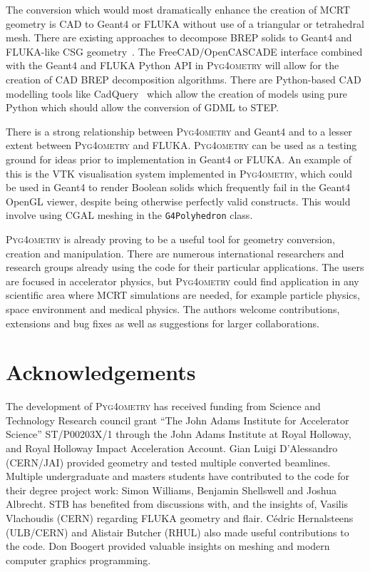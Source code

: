 \documentclass[final,5p,times,twocolumn]{elsarticle}
\newcommand{\pyinline}[1]{\lstinline[postbreak={}]{#1}}
\newcommand{\PYGEOMETRY}{\textsc{Pyg4ometry}}
\begin{document}
The conversion which would most dramatically enhance the creation of MCRT geometry is CAD to Geant4 or FLUKA
without use of a triangular or tetrahedral mesh. There are existing approaches to decompose BREP solids to Geant4 and
FLUKA-like CSG geometry~\cite{WangNuclSciTech31-82-2020, LuFusionEngineeringAndDesign124-2017}.
The FreeCAD/OpenCASCADE interface combined with the Geant4 and FLUKA Python API in \PYGEOMETRY{}
will allow for the creation of CAD BREP decomposition algorithms. There are Python-based CAD modelling tools like
CadQuery~\cite{cadquery} which allow the creation of models using pure Python which should allow the conversion of GDML to STEP.

There is a strong relationship between \PYGEOMETRY{} and Geant4 and to a lesser extent between
\PYGEOMETRY{} and FLUKA. \PYGEOMETRY{} can be used as a testing ground for ideas prior to
implementation in Geant4 or FLUKA. An example of this is the VTK visualisation system implemented in
\PYGEOMETRY{}, which could be used in Geant4 to render Boolean solids which frequently
fail in the Geant4 OpenGL viewer, despite being otherwise perfectly valid constructs.
This would involve using CGAL meshing in the \pyinline{G4Polyhedron} class. %

\PYGEOMETRY{} is already proving to be a useful tool for geometry conversion, creation and manipulation.
There are numerous international researchers and research groups already using the code for their particular applications.
The users are focused in accelerator physics, but \PYGEOMETRY{} could find application in any scientific
area where MCRT simulations are needed, for example particle physics, space environment and medical physics.
The authors welcome contributions, extensions and bug fixes as well as suggestions for larger collaborations.

\section{Acknowledgements}

The development of \PYGEOMETRY{} has received funding from Science and
Technology Research council grant ``The John Adams Institute for
Accelerator Science'' ST/P00203X/1 through the John Adams Institute at
Royal Holloway, and Royal Holloway Impact Acceleration Account. Gian Luigi D'Alessandro (CERN/JAI)
provided geometry and tested multiple converted beamlines. Multiple
undergraduate and masters students have contributed to the code for their
degree project work: Simon Williams, Benjamin Shellswell and Joshua Albrecht.
STB has benefited from discussions with, and the insights of, Vasilis Vlachoudis
(CERN) regarding FLUKA geometry and flair.  Cédric Hernalsteens (ULB/CERN) and
Alistair Butcher (RHUL) also made useful contributions to the code. Don Boogert
provided valuable insights on meshing and modern computer graphics programming.
\end{document}

